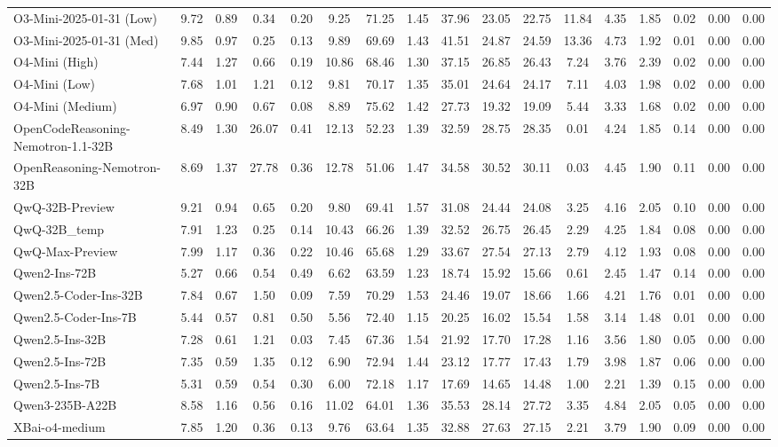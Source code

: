 \begin{table}[t]
{\begin{tabular}{|l|cccc|cc|cccccc|ccc|c|}
O3-Mini-2025-01-31 (Low) & 9.72 & 0.89 & 0.34 & 0.20 & 9.25 & 71.25 & 1.45 & 37.96 & 23.05 & 22.75 & 11.84 & 4.35 & 1.85 & 0.02 & 0.00 & 0.00 \\
O3-Mini-2025-01-31 (Med) & 9.85 & 0.97 & 0.25 & 0.13 & 9.89 & 69.69 & 1.43 & 41.51 & 24.87 & 24.59 & 13.36 & 4.73 & 1.92 & 0.01 & 0.00 & 0.00 \\
O4-Mini (High) & 7.44 & 1.27 & 0.66 & 0.19 & 10.86 & 68.46 & 1.30 & 37.15 & 26.85 & 26.43 & 7.24 & 3.76 & 2.39 & 0.02 & 0.00 & 0.00 \\
O4-Mini (Low) & 7.68 & 1.01 & 1.21 & 0.12 & 9.81 & 70.17 & 1.35 & 35.01 & 24.64 & 24.17 & 7.11 & 4.03 & 1.98 & 0.02 & 0.00 & 0.00 \\
O4-Mini (Medium) & 6.97 & 0.90 & 0.67 & 0.08 & 8.89 & 75.62 & 1.42 & 27.73 & 19.32 & 19.09 & 5.44 & 3.33 & 1.68 & 0.02 & 0.00 & 0.00 \\
OpenCodeReasoning-Nemotron-1.1-32B & 8.49 & 1.30 & 26.07 & 0.41 & 12.13 & 52.23 & 1.39 & 32.59 & 28.75 & 28.35 & 0.01 & 4.24 & 1.85 & 0.14 & 0.00 & 0.00 \\
OpenReasoning-Nemotron-32B & 8.69 & 1.37 & 27.78 & 0.36 & 12.78 & 51.06 & 1.47 & 34.58 & 30.52 & 30.11 & 0.03 & 4.45 & 1.90 & 0.11 & 0.00 & 0.00 \\
QwQ-32B-Preview & 9.21 & 0.94 & 0.65 & 0.20 & 9.80 & 69.41 & 1.57 & 31.08 & 24.44 & 24.08 & 3.25 & 4.16 & 2.05 & 0.10 & 0.00 & 0.00 \\
QwQ-32B\_temp & 7.91 & 1.23 & 0.25 & 0.14 & 10.43 & 66.26 & 1.39 & 32.52 & 26.75 & 26.45 & 2.29 & 4.25 & 1.84 & 0.08 & 0.00 & 0.00 \\
QwQ-Max-Preview & 7.99 & 1.17 & 0.36 & 0.22 & 10.46 & 65.68 & 1.29 & 33.67 & 27.54 & 27.13 & 2.79 & 4.12 & 1.93 & 0.08 & 0.00 & 0.00 \\
Qwen2-Ins-72B & 5.27 & 0.66 & 0.54 & 0.49 & 6.62 & 63.59 & 1.23 & 18.74 & 15.92 & 15.66 & 0.61 & 2.45 & 1.47 & 0.14 & 0.00 & 0.00 \\
Qwen2.5-Coder-Ins-32B & 7.84 & 0.67 & 1.50 & 0.09 & 7.59 & 70.29 & 1.53 & 24.46 & 19.07 & 18.66 & 1.66 & 4.21 & 1.76 & 0.01 & 0.00 & 0.00 \\
Qwen2.5-Coder-Ins-7B & 5.44 & 0.57 & 0.81 & 0.50 & 5.56 & 72.40 & 1.15 & 20.25 & 16.02 & 15.54 & 1.58 & 3.14 & 1.48 & 0.01 & 0.00 & 0.00 \\
Qwen2.5-Ins-32B & 7.28 & 0.61 & 1.21 & 0.03 & 7.45 & 67.36 & 1.54 & 21.92 & 17.70 & 17.28 & 1.16 & 3.56 & 1.80 & 0.05 & 0.00 & 0.00 \\
Qwen2.5-Ins-72B & 7.35 & 0.59 & 1.35 & 0.12 & 6.90 & 72.94 & 1.44 & 23.12 & 17.77 & 17.43 & 1.79 & 3.98 & 1.87 & 0.06 & 0.00 & 0.00 \\
Qwen2.5-Ins-7B & 5.31 & 0.59 & 0.54 & 0.30 & 6.00 & 72.18 & 1.17 & 17.69 & 14.65 & 14.48 & 1.00 & 2.21 & 1.39 & 0.15 & 0.00 & 0.00 \\
Qwen3-235B-A22B & 8.58 & 1.16 & 0.56 & 0.16 & 11.02 & 64.01 & 1.36 & 35.53 & 28.14 & 27.72 & 3.35 & 4.84 & 2.05 & 0.05 & 0.00 & 0.00 \\
XBai-o4-medium & 7.85 & 1.20 & 0.36 & 0.13 & 9.76 & 63.64 & 1.35 & 32.88 & 27.63 & 27.15 & 2.21 & 3.79 & 1.90 & 0.09 & 0.00 & 0.00 \\
\hline
\end{tabular}
}
\end{table}